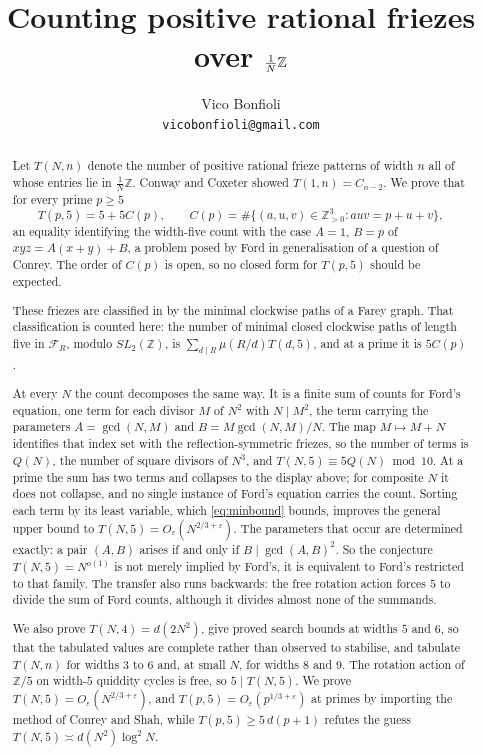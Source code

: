 \documentclass[11pt]{article}
\title{Counting positive rational friezes over $\tfrac{1}{N}\Z$}
\author{Vico Bonfioli\\ \small\texttt{vicobonfioli@gmail.com}}
\date{}
\theoremstyle{plain}
\theoremstyle{definition}
\newcommand{\Z}{\mathbb{Z}}
\begin{document}
\maketitle

\begin{abstract}
Let $T(N,n)$ denote the number of positive rational frieze patterns of width $n$ all of
whose entries lie in $\tfrac1N\Z$. Conway and Coxeter showed $T(1,n)=C_{n-2}$. We prove
that for every prime $p\ge5$
\[
  T(p,5)=5+5C(p),\qquad C(p)=\#\{(a,u,v)\in\Z_{>0}^3 : auv=p+u+v\},
\]
an equality identifying the width-five count with the case $A=1$, $B=p$ of
$xyz=A(x+y)+B$, a problem posed by Ford in generalisation of a question of Conrey. The
order of $C(p)$ is open, so no closed form for $T(p,5)$ should be expected.

These friezes are classified in \cite{KSSZ} by the minimal clockwise paths of a Farey
graph. That classification is counted here: the number of minimal closed
clockwise paths of length five in $\mathcal F_R$, modulo $SL_2(\Z)$, is
$\sum_{d\mid R}\mu(R/d)T(d,5)$, and at a prime it is $5C(p)$.

At every $N$ the count decomposes the same way. It is a finite sum of counts for Ford's
equation, one term for each divisor $M$ of $N^2$ with $N\mid M^2$, the term carrying the
parameters $A=\gcd(N,M)$ and $B=M\gcd(N,M)/N$. The map $M\mapsto M+N$ identifies that index
set with the reflection-symmetric friezes, so the number of terms is $Q(N)$, the number of
square divisors of $N^3$, and $T(N,5)\equiv 5Q(N)\bmod 10$. At a prime the sum has two terms and collapses to the
display above; for composite $N$ it does not collapse, and no single instance of Ford's
equation carries the count. Sorting each term by its least variable, which
\eqref{eq:minbound} bounds, improves the general upper bound to
$T(N,5)=O_\varepsilon(N^{2/3+\varepsilon})$. The parameters that occur are determined
exactly: a pair $(A,B)$ arises if and only if $B\mid\gcd(A,B)^2$. So the conjecture
$T(N,5)=N^{o(1)}$ is not merely implied by Ford's, it is equivalent to Ford's restricted
to that family. The transfer also runs backwards: the free rotation action forces
$5$ to divide the sum of Ford counts, although it divides almost none of the summands.

We also prove $T(N,4)=d(2N^2)$, give proved search bounds at widths $5$ and $6$, so that
the tabulated values are complete rather than observed to stabilise, and tabulate
$T(N,n)$ for widths $3$ to $6$ and, at small $N$, for widths $8$ and $9$. The rotation
action of $\Z/5$ on width-$5$ quiddity cycles is free, so $5\mid T(N,5)$. We prove
$T(N,5)=O_\varepsilon(N^{2/3+\varepsilon})$, and $T(p,5)=O_\varepsilon(p^{1/3+\varepsilon})$
at primes by importing the method of Conrey and Shah, while $T(p,5)\ge5\,d(p+1)$ refutes
the guess $T(N,5)\asymp d(N^2)\log^2N$.


\end{abstract}
\end{document}

